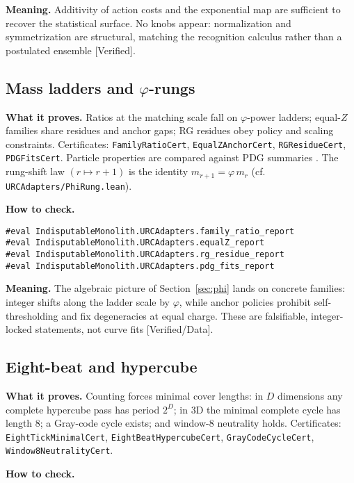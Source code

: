 \documentclass[11pt,a4paper,twoside]{article}
\numberwithin{equation}{section}
\newcommand{\phigr}{\varphi} %
\theoremstyle{customthm}
\theoremstyle{customdef}
\theoremstyle{customrem}
\begin{document}
\textbf{Meaning.} Additivity of action costs and the exponential map are sufficient to recover the statistical surface. No knobs appear: normalization and symmetrization are structural, matching the recognition calculus rather than a postulated ensemble [Verified].

\subsection{Mass ladders and $\phigr$-rungs}

\textbf{What it proves.} Ratios at the matching scale fall on $\phigr$-power ladders; equal-$Z$ families share residues and anchor gaps; RG residues obey policy and scaling constraints. Certificates: \texttt{FamilyRatioCert}, \texttt{EqualZAnchorCert}, \texttt{RGResidueCert}, \texttt{PDGFitsCert}. Particle properties are compared against PDG summaries \citep{PDG2024}. The rung-shift law \((r \mapsto r+1)\) is the identity
\(m_{r+1}=\phigr\,m_r\) (cf. \texttt{URCAdapters/PhiRung.lean}).

\textbf{How to check.}

\begin{lstlisting}
#eval IndisputableMonolith.URCAdapters.family_ratio_report
#eval IndisputableMonolith.URCAdapters.equalZ_report
#eval IndisputableMonolith.URCAdapters.rg_residue_report
#eval IndisputableMonolith.URCAdapters.pdg_fits_report
\end{lstlisting}

\textbf{Meaning.} The algebraic picture of Section~\ref{sec:phi} lands on concrete families: integer shifts along the ladder scale by $\phigr$, while anchor policies prohibit self-thresholding and fix degeneracies at equal charge. These are falsifiable, integer-locked statements, not curve fits [Verified/Data].

\subsection{Eight-beat and hypercube}

\textbf{What it proves.} Counting forces minimal cover lengths: in $D$ dimensions any complete hypercube pass has period $2^D$; in $3$D the minimal complete cycle has length $8$; a Gray-code cycle exists; and window-8 neutrality holds. Certificates: \texttt{EightTickMinimalCert}, \texttt{EightBeatHypercubeCert}, \texttt{GrayCodeCycleCert}, \texttt{Window8NeutralityCert}.

\textbf{How to check.}
\end{document}

